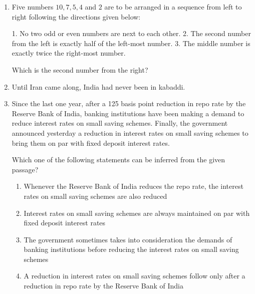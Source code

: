 \documentclass[journal,12pt,onecolumn]{IEEEtran}
\theoremstyle{remark}
\begin{document}
\begin{enumerate}[start=1, label=Q.\arabic*]
\item Five numbers $10, 7, 5, 4$ and $2$ are to be arranged in a sequence from left to right following the directions given below:  

1. No two odd or even numbers are next to each other.  
2. The second number from the left is exactly half of the left-most number.  
3. The middle number is exactly twice the right-most number.  

Which is the second number from the right?  
\begin{enumerate}
\end{enumerate}

\hfill{}


\item Until Iran came along, India had never been in kabaddi.  
\begin{enumerate}
\end{enumerate}

\hfill{}


\item Since the last one year, after a 125 basis point reduction in repo rate by the Reserve Bank of India, banking institutions have been making a demand to reduce interest rates on small saving schemes. Finally, the government announced yesterday a reduction in interest rates on small saving schemes to bring them on par with fixed deposit interest rates.  

Which one of the following statements can be inferred from the given passage?  
\begin{enumerate}
\item Whenever the Reserve Bank of India reduces the repo rate, the interest rates on small saving schemes are also reduced  
\item Interest rates on small saving schemes are always maintained on par with fixed deposit interest rates  
\item The government sometimes takes into consideration the demands of banking institutions before reducing the interest rates on small saving schemes  
\item A reduction in interest rates on small saving schemes follow only after a reduction in repo rate by the Reserve Bank of India  
\end{enumerate}


\end{enumerate}
\end{document}
